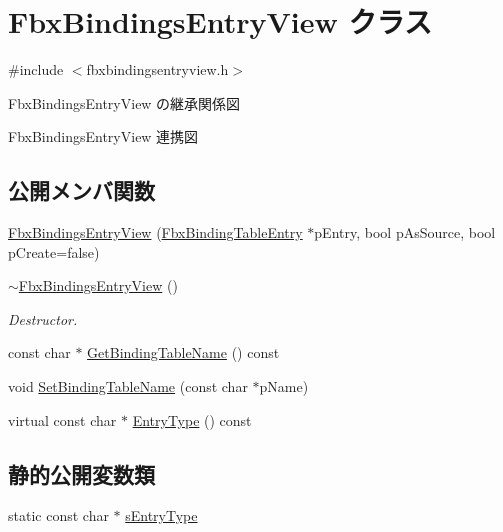 \hypertarget{class_fbx_bindings_entry_view}{}\section{Fbx\+Bindings\+Entry\+View クラス}
\label{class_fbx_bindings_entry_view}


{\ttfamily \#include $<$fbxbindingsentryview.\+h$>$}



Fbx\+Bindings\+Entry\+View の継承関係図


Fbx\+Bindings\+Entry\+View 連携図
\subsection*{公開メンバ関数}
\begin{DoxyCompactItemize}
\item 
\hyperlink{class_fbx_bindings_entry_view_a9ed299bf864d23bf17b1ab1d16a1d3d6}{Fbx\+Bindings\+Entry\+View} (\hyperlink{class_fbx_binding_table_entry}{Fbx\+Binding\+Table\+Entry} $\ast$p\+Entry, bool p\+As\+Source, bool p\+Create=false)
\item 
\hyperlink{class_fbx_bindings_entry_view_a82b1df38bb6aeb6548e6edbed48c3f8b}{$\sim$\+Fbx\+Bindings\+Entry\+View} ()
\begin{DoxyCompactList}\small\item\em Destructor. \end{DoxyCompactList}\item 
const char $\ast$ \hyperlink{class_fbx_bindings_entry_view_a1b3909ebdbe0164c910056526eedcdc6}{Get\+Binding\+Table\+Name} () const
\item 
void \hyperlink{class_fbx_bindings_entry_view_af367ef628865d839cc034acf224ffe78}{Set\+Binding\+Table\+Name} (const char $\ast$p\+Name)
\item 
virtual const char $\ast$ \hyperlink{class_fbx_bindings_entry_view_a25f821ea63f19592173e7785356c04f9}{Entry\+Type} () const
\end{DoxyCompactItemize}
\subsection*{静的公開変数類}
\begin{DoxyCompactItemize}
\item 
static const char $\ast$ \hyperlink{class_fbx_bindings_entry_view_a209f878b5007e944ca37fb6f73139c2e}{s\+Entry\+Type}
\end{DoxyCompactItemize}
